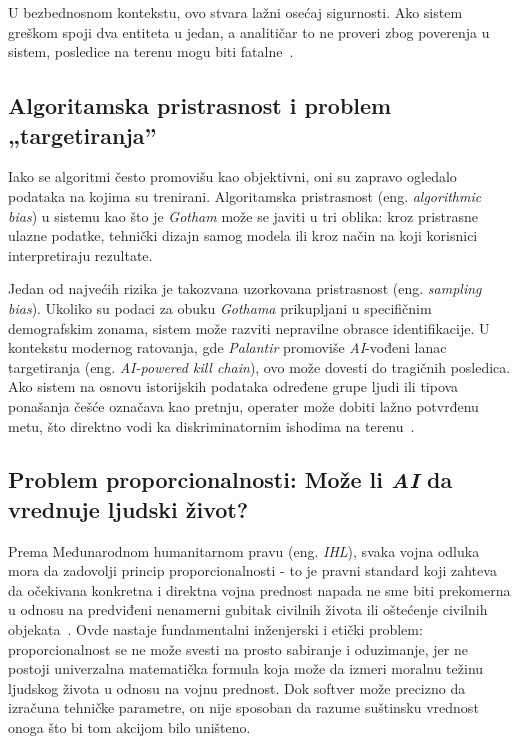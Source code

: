 ﻿\documentclass[12pt]{article}
\begin{document}
U bezbednosnom kontekstu, ovo stvara lažni osećaj sigurnosti.
Ako sistem greškom spoji dva entiteta u jedan, a analitičar to ne proveri zbog poverenja u sistem, posledice na terenu mogu biti fatalne~\cite{ethical2025reconnaissance, tilbury2024automation}.

\subsection{Algoritamska pristrasnost i problem „targetiranja”}

Iako se algoritmi često promovišu kao objektivni, oni su zapravo ogledalo podataka na kojima su trenirani.
Algoritamska pristrasnost (eng. \textit{algorithmic bias}) u sistemu kao što je \textit{Gotham} može se javiti u tri oblika: kroz pristrasne ulazne podatke, tehnički dizajn samog modela ili kroz način na koji korisnici interpretiraju rezultate.

Jedan od najvećih rizika je takozvana uzorkovana pristrasnost (eng. \textit{sampling bias}). Ukoliko su podaci za obuku \textit{Gothama} prikupljani u specifičnim demografskim zonama, sistem može razviti nepravilne obrasce identifikacije.
U kontekstu modernog ratovanja, gde \textit{Palantir} promoviše \textit{AI}-vođeni lanac targetiranja (eng. \textit{AI-powered kill chain}), ovo može dovesti do tragičnih posledica.
Ako sistem na osnovu istorijskih podataka određene grupe ljudi ili tipova ponašanja češće označava kao pretnju, operater može dobiti lažno potvrđenu metu, što direktno vodi ka diskriminatornim ishodima na terenu~\cite{icrc2024bias, carnegie2024private}.

\subsection{Problem proporcionalnosti: Može li \textit{AI} da vrednuje ljudski život?}

Prema Međunarodnom humanitarnom pravu (eng. \textit{IHL}), svaka vojna odluka mora da zadovolji princip proporcionalnosti - to je pravni standard koji zahteva da očekivana konkretna i direktna vojna prednost napada ne sme biti prekomerna u odnosu na predviđeni nenamerni gubitak civilnih života ili oštećenje civilnih objekata~\cite{woodcock2024human, icrc2024bias}.
Ovde nastaje fundamentalni inženjerski i etički problem: proporcionalnost se ne može svesti na prosto sabiranje i oduzimanje, jer ne postoji univerzalna matematička formula koja može da izmeri moralnu težinu ljudskog života u odnosu na vojnu prednost. Dok softver može precizno da izračuna tehničke parametre, on nije sposoban da razume suštinsku vrednost onoga što bi tom akcijom bilo uništeno.
\end{document}
